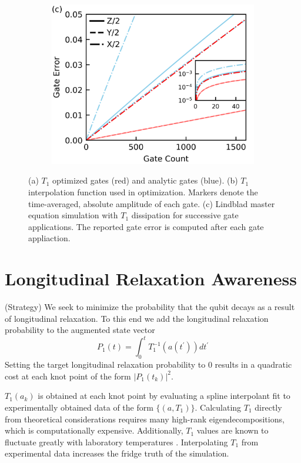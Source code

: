 \documentclass[
  amsfonts,
  amsmath,
  tbtags,
  amssymb,
  aps,
  nobibnotes,
  twocolumn,
  superscriptaddress,
]{revtex4-2}
\begin{document}
\begin{figure}[ht]
\begin{subfigure}{.23\textwidth}
  \end{subfigure}\hfill
  \begin{subfigure}{.4\textwidth}
    \includegraphics[width=\linewidth]{assets/f1c.png}
  \end{subfigure}
  \caption{
    (a) $T_{1}$ optimized gates (red) and analytic gates (blue).
    (b) $T_{1}$ interpolation function used in optimization. Markers
    denote the time-averaged, absolute amplitude of each gate.
    (c) Lindblad master equation simulation with $T_{1}$ dissipation
    for successive gate applications. The reported gate error is computed after
    each gate appliaction.
  }
\end{figure}

\section{Longitudinal Relaxation Awareness}
(Strategy) We seek to minimize the probability
that the qubit decays as a result of longitudinal
relaxation. To this end we add the
longitudinal relaxation probability
to the augmented state vector
\begin{equation}
  P_{1}(t) = \int_{0}^{t} T_{1}^{-1}(a(t^{\prime})) dt^{\prime}
\end{equation}
Setting the target
longitudinal relaxation probability to 0 results in
a quadratic cost at each knot point
of the form ${\lvert P_{1}(t_{k}) \rvert}^{2}$.

$T_{1}(a_{k})$
is obtained at each knot point by evaluating
a spline interpolant fit to
experimentally obtained data of the form
$\{(a, T_{1})\}$.
Calculating $T_{1}$ directly from theoretical
considerations requires many high-rank
eigendecompositions, which
is computationally expensive. Additionally,
$T_{1}$ values are known to fluctuate greatly
with laboratory temperatures \cite{klimov2018fluctuations}.
Interpolating $T_{1}$ from experimental data increases
the fridge truth of the simulation.
\end{document}

